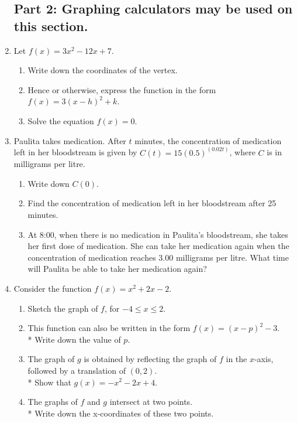 \documentclass[]{book}
\begin{document}
\begin{enumerate}
\newpage
\subsection*{Part 2: Graphing calculators may be used on this section.}

\item Let $f(x)=3x^2-12x+7$.
\begin{enumerate}
    \item Write down the coordinates of the vertex.
    \item Hence or otherwise, express the function in the form $f(x)=3(x-h)^2 +k$.
    \item Solve the equation  $f(x)=0$.
\end{enumerate}

\item Paulita takes medication. After $t$ minutes, the concentration of medication left in her bloodstream is given by $\displaystyle C(t)=15(0.5)^{(0.02t)}$, where $C$ is in milligrams per litre.
\begin{enumerate}
    \item Write down $C(0)$.
    \item Find the concentration of medication left in her bloodstream after 25 minutes.
    \item At 8:00, when there is no medication in Paulita's bloodstream, she takes her first dose of medication. She can take her medication again when the concentration of medication reaches 3.00 milligrams per litre. What time will Paulita be able to take her medication again?
\end{enumerate}

\newpage
\item Consider the function $f(x)=x^2+2x-2$.
\begin{enumerate}
    \item Sketch the graph of $f$, for $-4 \leq x \leq 2$.
    \item This function can also be written in the form $f(x)=(x-p)^2 -3$.\\* 
    Write down the value of $p$.
    \item The graph of $g$ is obtained by reflecting the graph of $f$ in the $x$-axis, followed by a translation of $(0, 2)$.\\* Show that $g(x)=-x^2-2x+4$.
    \item The graphs of $f$ and $g$ intersect at two points.\\*
    Write down the x-coordinates of these two points.
\end{enumerate}


\end{enumerate}
\end{document}
